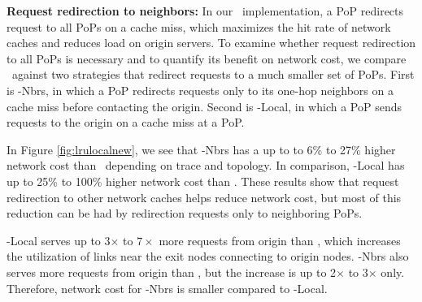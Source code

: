 \textbf{Request redirection to neighbors:} 
In our \invlru\ implementation, a PoP redirects request to all PoPs on a cache miss, which maximizes the hit rate of network caches and reduces load on origin servers. To examine whether request redirection to all PoPs is necessary and to quantify its benefit on network cost, we compare  \invlru\ against two strategies that redirect requests to a much smaller set of PoPs. First is \textsf{\invlru-Nbrs}, in which a PoP redirects requests only to its one-hop neighbors on a cache miss before contacting the origin. Second is \textsf{\invlru-Local}, in which a PoP sends requests to the origin on a cache miss at a PoP. 







In Figure  \ref{fig:lrulocalnew}, we see that \textsf{\invlru-Nbrs} has a up to  to 6\% to 27\% higher network cost than \invlru\ depending on trace and topology. In comparison, \textsf{\invlru-Local} has up to 25\% to 100\% higher network cost than \invlru.  These results show that request redirection to other network caches helps reduce network cost, but most of this reduction can be had by redirection requests only to neighboring PoPs. 



\textsf{\invlru-Local}  serves up to 3$\times$ to $7\times$ more requests from origin than \invlru, which increases the utilization of links near the exit nodes connecting to origin nodes. 
\textsf{\invlru-Nbrs} also serves more requests from origin than \invlru, but the increase is up to 2$\times$ to 3$\times$ only. Therefore, network cost for \textsf{\invlru-Nbrs} is smaller compared to \textsf{\invlru-Local}.



